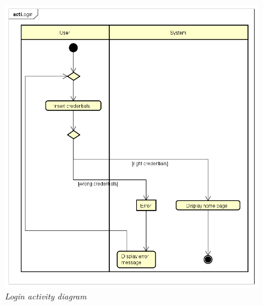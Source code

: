 \documentclass[table, 12pt]{article}
\begin{document}
\begin{figure}[H]
    \centering
    \includegraphics[scale=0.45]{assets/Activity-Diagrams/act_login.png}
    \caption{\textit{Login activity diagram}}
\end{figure}
\end{document}

